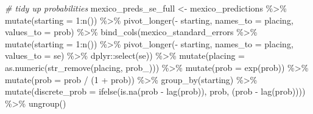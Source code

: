 \documentclass[
]{book}
\newenvironment{Shaded}{\begin{snugshade}}{\end{snugshade}}
\newcommand{\AttributeTok}[1]{\textcolor[rgb]{0.77,0.63,0.00}{#1}}
\newcommand{\CommentTok}[1]{\textcolor[rgb]{0.56,0.35,0.01}{\textit{#1}}}
\newcommand{\DecValTok}[1]{\textcolor[rgb]{0.00,0.00,0.81}{#1}}
\newcommand{\FunctionTok}[1]{\textcolor[rgb]{0.00,0.00,0.00}{#1}}
\newcommand{\NormalTok}[1]{#1}
\newcommand{\OtherTok}[1]{\textcolor[rgb]{0.56,0.35,0.01}{#1}}
\newcommand{\SpecialCharTok}[1]{\textcolor[rgb]{0.00,0.00,0.00}{#1}}
\newcommand{\StringTok}[1]{\textcolor[rgb]{0.31,0.60,0.02}{#1}}
\begin{document}
\begin{Shaded}
\begin{Highlighting}[]
\CommentTok{\# tidy up probabilities}
\NormalTok{mexico\_preds\_se\_full }\OtherTok{\textless{}{-}}\NormalTok{ mexico\_predictions }\SpecialCharTok{\%\textgreater{}\%}
  \FunctionTok{mutate}\NormalTok{(}\AttributeTok{starting =} \DecValTok{1}\SpecialCharTok{:}\FunctionTok{n}\NormalTok{()) }\SpecialCharTok{\%\textgreater{}\%}
  \FunctionTok{pivot\_longer}\NormalTok{(}\SpecialCharTok{{-}}\NormalTok{ starting, }\AttributeTok{names\_to =} \StringTok{\textquotesingle{}placing\textquotesingle{}}\NormalTok{, }\AttributeTok{values\_to =} \StringTok{\textquotesingle{}prob\textquotesingle{}}\NormalTok{) }\SpecialCharTok{\%\textgreater{}\%} 
  \FunctionTok{bind\_cols}\NormalTok{(mexico\_standard\_errors }\SpecialCharTok{\%\textgreater{}\%} \FunctionTok{mutate}\NormalTok{(}\AttributeTok{starting =} \DecValTok{1}\SpecialCharTok{:}\FunctionTok{n}\NormalTok{()) }\SpecialCharTok{\%\textgreater{}\%}
  \FunctionTok{pivot\_longer}\NormalTok{(}\SpecialCharTok{{-}}\NormalTok{ starting, }\AttributeTok{names\_to =} \StringTok{\textquotesingle{}placing\textquotesingle{}}\NormalTok{, }\AttributeTok{values\_to =} \StringTok{\textquotesingle{}se\textquotesingle{}}\NormalTok{) }\SpecialCharTok{\%\textgreater{}\%}
\NormalTok{    dplyr}\SpecialCharTok{::}\FunctionTok{select}\NormalTok{(se)) }\SpecialCharTok{\%\textgreater{}\%}
  \FunctionTok{mutate}\NormalTok{(}\AttributeTok{placing =} \FunctionTok{as.numeric}\NormalTok{(}\FunctionTok{str\_remove}\NormalTok{(placing, }\StringTok{\textquotesingle{}prob\_\textquotesingle{}}\NormalTok{))) }\SpecialCharTok{\%\textgreater{}\%}
  \FunctionTok{mutate}\NormalTok{(}\AttributeTok{prob =} \FunctionTok{exp}\NormalTok{(prob)) }\SpecialCharTok{\%\textgreater{}\%}
  \FunctionTok{mutate}\NormalTok{(}\AttributeTok{prob =}\NormalTok{ prob }\SpecialCharTok{/}\NormalTok{ (}\DecValTok{1} \SpecialCharTok{+}\NormalTok{ prob)) }\SpecialCharTok{\%\textgreater{}\%}
  \FunctionTok{group\_by}\NormalTok{(starting) }\SpecialCharTok{\%\textgreater{}\%} 
  \FunctionTok{mutate}\NormalTok{(}\AttributeTok{discrete\_prob =} \FunctionTok{ifelse}\NormalTok{(}\FunctionTok{is.na}\NormalTok{(prob }\SpecialCharTok{{-}} \FunctionTok{lag}\NormalTok{(prob)), prob, (prob }\SpecialCharTok{{-}} \FunctionTok{lag}\NormalTok{(prob)))) }\SpecialCharTok{\%\textgreater{}\%}
  \FunctionTok{ungroup}\NormalTok{()}


\end{Highlighting}
\end{Shaded}
\end{document}
